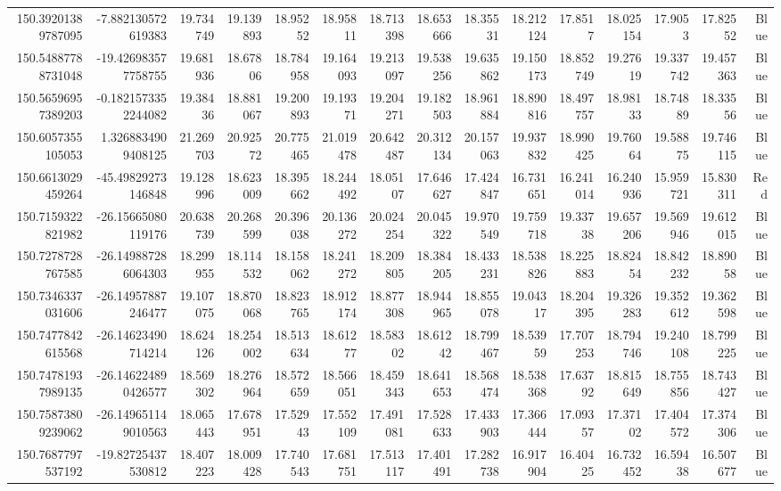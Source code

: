 \begin{center}
\begin{longtable}{rrrrrrrrrrrrrrr}
150.39201389787095 & -7.882130572619383 & 19.734749 & 19.139893 & 18.95252 & 18.95811 & 18.713398 & 18.653666 & 18.35531 & 18.212124 & 17.8517 & 18.025154 & 17.9053 & 17.82552 & Blue \\
150.54887788731048 & -19.426983577758755 & 19.681936 & 18.67806 & 18.784958 & 19.164093 & 19.213097 & 19.538256 & 19.635862 & 19.150173 & 18.852749 & 19.27619 & 19.337742 & 19.457363 & Blue \\
150.56596957389203 & -0.1821573352244082 & 19.38436 & 18.881067 & 19.200893 & 19.19371 & 19.204271 & 19.182503 & 18.961884 & 18.890816 & 18.497757 & 18.98133 & 18.74889 & 18.33556 & Blue \\
150.6057355105053 & 1.3268834909408125 & 21.269703 & 20.92572 & 20.775465 & 21.019478 & 20.642487 & 20.312134 & 20.157063 & 19.937832 & 18.990425 & 19.76064 & 19.58875 & 19.746115 & Blue \\
150.6613029459264 & -45.49829273146848 & 19.128996 & 18.623009 & 18.395662 & 18.244492 & 18.05107 & 17.646627 & 17.424847 & 16.731651 & 16.241014 & 16.240936 & 15.959721 & 15.830311 & Red \\
150.7159322821982 & -26.15665080119176 & 20.638739 & 20.268599 & 20.396038 & 20.136272 & 20.024254 & 20.045322 & 19.970549 & 19.759718 & 19.33738 & 19.657206 & 19.569946 & 19.612015 & Blue \\
150.7278728767585 & -26.149887286064303 & 18.299955 & 18.114532 & 18.158062 & 18.241272 & 18.209805 & 18.384205 & 18.433231 & 18.538826 & 18.225883 & 18.82454 & 18.842232 & 18.89058 & Blue \\
150.7346337031606 & -26.14957887246477 & 19.107075 & 18.870068 & 18.823765 & 18.912174 & 18.877308 & 18.944965 & 18.855078 & 19.04317 & 18.204395 & 19.326283 & 19.352612 & 19.362598 & Blue \\
150.7477842615568 & -26.14623490714214 & 18.624126 & 18.254002 & 18.513634 & 18.61277 & 18.58302 & 18.61242 & 18.799467 & 18.53959 & 17.707253 & 18.794746 & 19.240108 & 18.799225 & Blue \\
150.74781937989135 & -26.146224890426577 & 18.569302 & 18.276964 & 18.572659 & 18.566051 & 18.459343 & 18.641653 & 18.568474 & 18.538368 & 17.63792 & 18.815649 & 18.755856 & 18.743427 & Blue \\
150.75873809239062 & -26.149651149010563 & 18.065443 & 17.678951 & 17.52943 & 17.552109 & 17.491081 & 17.528633 & 17.433903 & 17.366444 & 17.09357 & 17.37102 & 17.404572 & 17.374306 & Blue \\
150.7687797537192 & -19.82725437530812 & 18.407223 & 18.009428 & 17.740543 & 17.681751 & 17.513117 & 17.401491 & 17.282738 & 16.917904 & 16.40425 & 16.732452 & 16.59438 & 16.507677 & Blue \\

\end{longtable}
\end{center}
